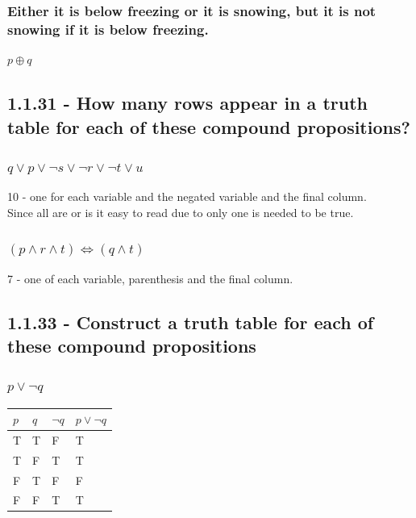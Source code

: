 \documentclass[12pt, a4paper]{report}
\begin{document}
				\subsubsection{Either it is below freezing or it is snowing, but it is not snowing if it is below freezing.}
					$p \oplus q$
\setcounter{subsection}{30}
			\subsection{1.1.31 - How many rows appear in a truth table for each of these compound propositions?}
\setcounter{subsubsection}{2}
				\subsubsection{$q\lor p \lor \neg s \lor \neg r \lor \neg t \lor u$}
					10 - one for each variable and the negated variable and the final column.\\
					Since all are or is it easy to read due to only one is needed to be true.
				\subsubsection{$(p\land r \land t) \iff ( q\land t)$}
					7 - one of each variable, parenthesis and the final column.

\setcounter{subsection}{32}
			\subsection{1.1.33 - Construct a truth table for each of these compound propositions}

\setcounter{subsubsection}{1}
				\subsubsection{$p\lor \neg q$}
					\begin{table}[h!]
						\begin{tabular}{|l|l|l|l|}
						\hline
						$p$ & $q$ & $\neg q$ & $p \lor \neg q$ \\ \hline
						T   & T   & F        & T               \\ \hline
						T   & F   & T        & T               \\ \hline
						F   & T   & F        & F               \\ \hline
						F   & F   & T        & T               \\ \hline
					\end{tabular}
					\end{table}
\end{document}
